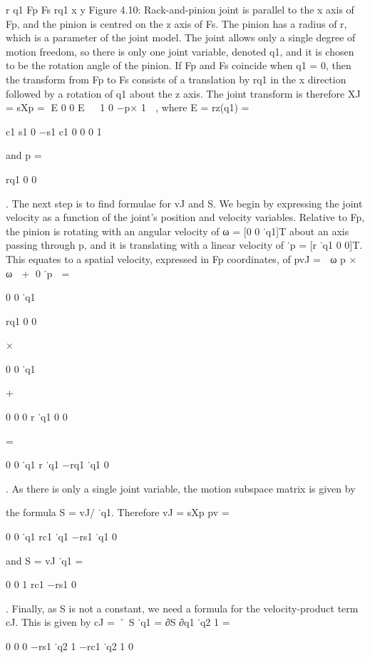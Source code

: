 r q1 Fp Fs rq1 x y Figure 4.10: Rack-and-pinion joint is parallel to the x axis of Fp, and the pinion is centred on the z axis of Fs. The pinion has a radius of r, which is a parameter of the joint model. The joint allows only a single degree of motion freedom, so there is only one joint variable, denoted q1, and it is chosen to be the rotation angle of the pinion. If Fp and Fs coincide when q1 = 0, then the transform from Fp to Fs consists of a translation by rq1 in the x direction followed by a rotation of q1 about the z axis. The joint transform is therefore XJ = sXp = E 0 0 E   1 0 −p× 1  , where E = rz(q1) =

c1 s1 0 −s1 c1 0 0 0 1

and p =

rq1 0 0

. The next step is to find formulae for vJ and S. We begin by expressing the joint velocity as a function of the joint’s position and velocity variables. Relative to Fp, the pinion is rotating with an angular velocity of ω = [0 0 ˙q1]T about an axis passing through p, and it is translating with a linear velocity of ˙p = [r ˙q1 0 0]T. This equates to a spatial velocity, expressed in Fp coordinates, of pvJ =  ω p × ω  + 0 ˙p  =

0 0 ˙q1

rq1 0 0

×

0 0 ˙q1

+

0 0 0 r ˙q1 0 0

=

0 0 ˙q1 r ˙q1 −rq1 ˙q1 0

. As there is only a single joint variable, the motion subspace matrix is given by

the formula S = vJ/ ˙q1. Therefore vJ = sXp pv =

0 0 ˙q1 rc1 ˙q1 −rs1 ˙q1 0

and S = vJ ˙q1 =

0 0 1 rc1 −rs1 0

. Finally, as S is not a constant, we need a formula for the velocity-product term cJ. This is given by cJ = ˚ S ˙q1 = ∂S ∂q1 ˙q2 1 =

0 0 0 −rs1 ˙q2 1 −rc1 ˙q2 1 0

